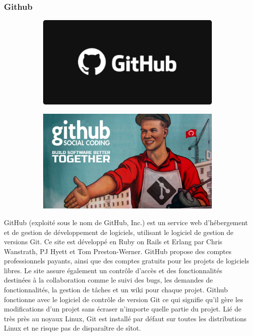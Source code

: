 \documentclass{article}
\begin{document}
\subsubsection{Github}
\begin{figure}[h!]
	\centering
  	\begin{subfigure}[b]{0.4\linewidth}
    \includegraphics[width=\linewidth]{github.png}
	\end{subfigure}
    \begin{subfigure}[b]{0.5\linewidth}
	\includegraphics[width=\linewidth]{githubc.jpeg}
	\end{subfigure}
\end{figure}
 
GitHub (exploité sous le nom de GitHub, Inc.) est un service web d'hébergement et de gestion de développement de logiciels, utilisant le logiciel de gestion de versions Git. Ce site est développé en Ruby on Rails et Erlang par Chris Wanstrath, PJ Hyett et Tom Preston-Werner. GitHub propose des comptes professionnels payants, ainsi que des comptes gratuits pour les projets de logiciels libres. Le site assure également un contrôle d'accès et des fonctionnalités destinées à la collaboration comme le suivi des bugs, les demandes de fonctionnalités, la gestion de tâches et un wiki pour chaque projet. 
\newline
Github fonctionne avec le logiciel de contrôle de version Git ce qui signifie qu’il gère les modifications d’un projet sans écraser n’importe quelle partie du projet. Lié de très près au noyaux Linux, Git est installé par défaut sur toutes les distributions Linux et ne risque pas de disparaître de sîtot.
\end{document}
